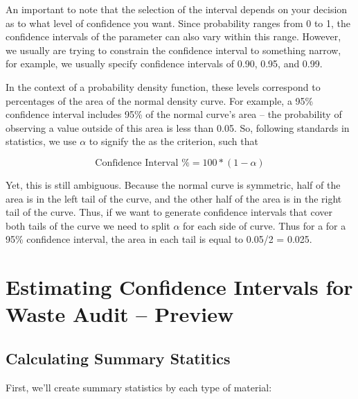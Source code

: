 \documentclass{tufte-handout}\usepackage[]{graphicx}\usepackage[]{color}
\begin{document}
An important to note that the selection of the interval depends on your decision as to what level of confidence you want. Since probability ranges from 0 to 1, the confidence intervals of the parameter can also vary within this range. However, we usually are trying to constrain the confidence interval to something narrow, for example, we usually specify confidence intervals of 0.90, 0.95, and 0.99. 


In the context of a probability density function, these levels correspond to percentages of the area of the normal density curve. For example, a 95\% confidence interval includes 95\% of the normal curve's area -- the probability of observing a value outside of this area is less than 0.05. So, following standards in statistics, we use $\alpha$ to signify the as the criterion, such that

\begin{equation}
\textrm{Confidence Interval \% } = 100 * (1-\alpha)
\end{equation}

Yet, this is still ambiguous. Because the normal curve is symmetric, half of the area is in the left tail of the curve, and the other half of the area is in the right tail of the curve. Thus, if we want to generate confidence intervals that cover both tails of the curve we need to split $\alpha$ for each side of curve. Thus for a for a 95\% confidence interval, the area in each tail is equal to 0.05/2 = 0.025. 

\section{Estimating Confidence Intervals for Waste Audit -- Preview}

\subsection{Calculating Summary Statitics}

First, we'll create summary statistics by each type of material: 
\end{document}
